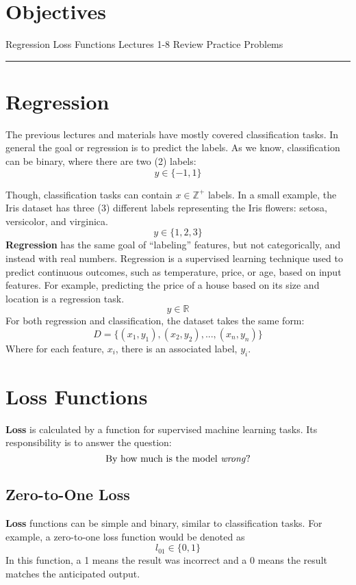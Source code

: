 
\section*{Objectives}
\begin{outline}
    \1 Regression
    \1 Loss Functions
    \1 Lectures 1-8 Review
    \1 Practice Problems
\end{outline}

\rule[0.0051in]{\textwidth}{0.00025in}

\section{Regression}
The previous lectures and materials have mostly covered classification tasks. In general the goal or regression is to predict the labels.  As we know, classification can be binary, where there are two (2) labels: 
\[
y \in \{-1, 1\}
\]

Though, classification tasks can contain $x\mathbb{\in Z^+}$ labels. In a small example, the Iris dataset has three (3) different labels representing the Iris flowers: setosa, versicolor, and virginica.
\[
y \in \{1, 2, 3\}
\]
\textbf{Regression} has the same goal of ``labeling'' features, but not categorically, and instead with real numbers. Regression is a supervised learning technique used to predict continuous outcomes, such as temperature, price, or age, based on input features. For example, predicting the price of a house based on its size and location is a regression task.
\[
y \in \mathbb{R}
\]
For both regression and classification, the dataset takes the same form:
\[
D = \{(x_1, y_1), (x_2, y_2),...,(x_n, y_n)\}
\]
Where for each feature, $x_i$, there is an associated label, $y_i$.

\section{Loss Functions}
\textbf{Loss} is calculated by a function for supervised machine learning tasks. Its responsibility is to answer the question: 
\[
\text{By how much is the model \textit{wrong}?}
\]

\subsection{Zero-to-One Loss}
\textbf{Loss} functions can be simple and binary, similar to classification tasks. For example, a zero-to-one loss function would be denoted as
\[
l_{01} \in \{0, 1\}
\]
In this function, a 1 means the result was incorrect and a 0 means the result matches the anticipated output.

